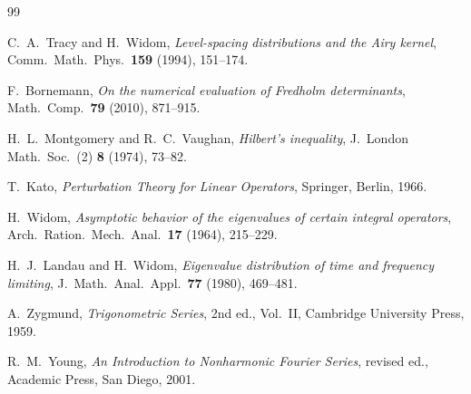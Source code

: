 \documentclass[12pt,a4paper]{amsart}
\theoremstyle{definition}
\begin{document}
\begin{thebibliography}{99}

C.~A.~Tracy and H.~Widom,
\textit{Level-spacing distributions and the Airy kernel},
Comm.\ Math.\ Phys.\ \textbf{159} (1994), 151--174.

F.~Bornemann,
\textit{On the numerical evaluation of Fredholm determinants},
Math.\ Comp.\ \textbf{79} (2010), 871--915.

H.~L.~Montgomery and R.~C.~Vaughan,
\textit{Hilbert's inequality},
J.\ London Math.\ Soc.\ (2) \textbf{8} (1974), 73--82.

T.~Kato,
\textit{Perturbation Theory for Linear Operators},
Springer, Berlin, 1966.

H.~Widom,
\textit{Asymptotic behavior of the eigenvalues of certain integral operators},
Arch.\ Ration.\ Mech.\ Anal.\ \textbf{17} (1964), 215--229.

H.~J.~Landau and H.~Widom,
\textit{Eigenvalue distribution of time and frequency limiting},
J.\ Math.\ Anal.\ Appl.\ \textbf{77} (1980), 469--481.

A.~Zygmund,
\textit{Trigonometric Series}, 2nd ed., Vol.~II,
Cambridge University Press, 1959.

R.~M.~Young,
\textit{An Introduction to Nonharmonic Fourier Series}, revised ed.,
Academic Press, San Diego, 2001.

\end{thebibliography}
\end{document}
